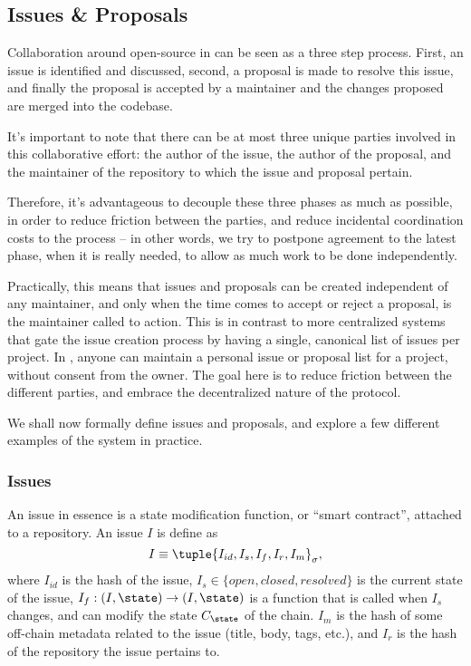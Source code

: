 \subsection{Issues \& Proposals}

Collaboration around open-source in \oscoin{} can be seen as a three step
process.  First, an issue is identified and discussed, second, a proposal is
made to resolve this issue, and finally the proposal is accepted by a
maintainer and the changes proposed are merged into the codebase.

It's important to note that there can be at most three unique parties involved
in this collaborative effort: the author of the issue, the author of the
proposal, and the maintainer of the repository to which the issue and proposal
pertain.

Therefore, it's advantageous to decouple these three phases as much as
possible, in order to reduce friction between the parties, and reduce
incidental coordination costs to the process -- in other words, we try to
postpone agreement to the latest phase, when it is really needed, to allow as
much work to be done independently.

Practically, this means that issues and proposals can be created independent of
any maintainer, and only when the time comes to accept or reject a proposal, is
the maintainer called to action. This is in contrast to more centralized
systems that gate the issue creation process by having a single, canonical list
of issues per project. In \oscoin{}, anyone can maintain a personal issue or
proposal list for a project, without consent from the owner. The goal here is
to reduce friction between the different parties, and embrace the decentralized
nature of the protocol.

We shall now formally define issues and proposals, and explore a few different
examples of the system in practice.

\subsubsection{Issues}

An issue in essence is a state modification function, or ``smart contract'',
attached to a repository. An issue $I$ is define as
\[
    I \equiv \tuple{I_{id}, I_s, I_f, I_r, I_m}_{\sigma},
\]
where $I_{id}$ is the \blake{} hash of the issue, $I_s \in \{open, closed,
resolved\}$ is the current state of the issue, $I_f : (I, \state) \to (I,
\state)$ is a function that is called when $I_s$ changes, and can modify the
state $C_\state$ of the chain. $I_m$ is the hash of some off-chain metadata
related to the issue (title, body, tags, etc.), and $I_r$ is the \blake{} hash
of the repository the issue pertains to.

